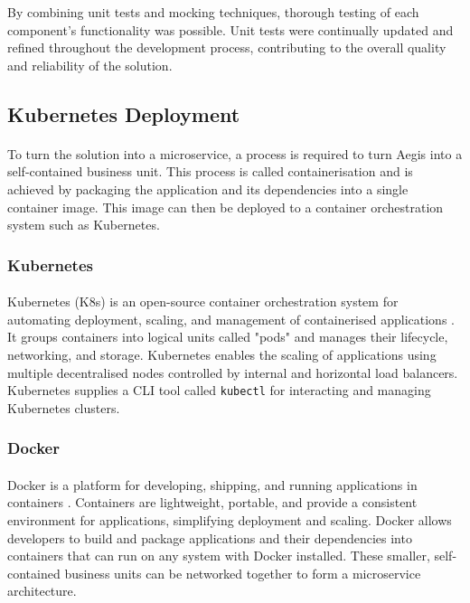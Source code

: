 \documentclass[12pt, conference, final, a4paper, onecolumn, compsoc]{IEEEtran}
\begin{document}
By combining unit tests and mocking techniques, thorough testing of each
component's functionality was possible. Unit tests were continually updated and
refined throughout the development process, contributing to the overall quality
and reliability of the solution.

\subsection{Kubernetes Deployment}
\paragraph{}

To turn the solution into a microservice, a process is required to turn Aegis
into a self-contained business unit. This process is called containerisation and
is achieved by packaging the application and its dependencies into a single
container image. This image can then be deployed to a container orchestration
system such as Kubernetes.

\subsubsection*{Kubernetes}
\paragraph{}
Kubernetes (K8s) is an open-source container orchestration system
for automating deployment, scaling, and management of containerised applications
\citep{k8s-docs}. It groups containers into logical units called "pods" and
manages their lifecycle, networking, and storage. Kubernetes enables the scaling
of applications using multiple decentralised nodes controlled by internal and
horizontal load balancers. Kubernetes supplies a CLI tool called
\texttt{kubectl} for interacting and managing Kubernetes clusters.

\subsubsection*{Docker}
\paragraph{}
Docker is a platform for developing, shipping, and running
applications in containers \citep{docker}. Containers are lightweight, portable,
and provide a consistent environment for applications, simplifying deployment
and scaling. Docker allows developers to build and package applications and
their dependencies into containers that can run on any system with Docker
installed. These smaller, self-contained business units can be networked
together to form a microservice architecture.
\end{document}
